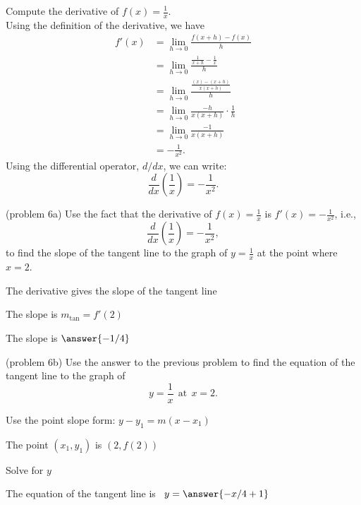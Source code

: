 \documentclass[handout]{ximera}
\begin{document}
\begin{example}[example 6]
Compute the derivative of $f(x) = \displaystyle{\frac{1}{x}}$.\\
Using the definition of the derivative, we have
\begin{align*}
f'(x) &= \lim_{h \to 0} \frac{f(x+h)-f(x)}{h}\\[5pt]
&= \lim_{h \to 0} \frac{\frac{1}{x+h}- \frac{1}{x}}{h}\\[5pt]
&= \lim_{h \to 0} \frac{\frac{(x) - (x+h)}{x(x+h)}}{h} \\[5pt]
&=  \lim_{h \to 0} \frac{-h}{x(x+h)}\cdot \frac{1}{h}\\[5pt]
&= \lim_{h \to 0} \frac{-1}{x(x+h)} \\[5pt]
&= -\frac{1}{x^2}.
\end{align*}
Using the differential operator, $d/dx$, we can write:
\[
 \frac{d}{dx}\left({\frac{1}{x}}\right) = -\frac{1}{x^2}.
\]
\end{example}




\begin{problem}(problem 6a)
Use the fact that the derivative of $f(x) = \frac{1}{x}$ is $f'(x) = -\frac{1}{x^2}$,
i.e., 
\[
\frac{d}{dx}\left(\frac{1}{x}\right) = -\frac{1}{x^2},
\]
to find the slope of the tangent line to the graph of 
$y = \frac{1}{x}$ at the point where $x = 2$.\\
\begin{hint}
The derivative gives the slope of the tangent line
\end{hint}
\begin{hint}
The slope is $m_{\text{tan}} = f'(2)$
\end{hint}
The slope is $\answer{-1/4}$
\end{problem}




\begin{problem}(problem 6b)
Use the answer to the previous problem to find the equation of the tangent line to the graph of 
\[
y = \frac{1}{x} \ \ \text{at} \  \ x=2.
\]
\begin{hint}
Use the point slope form: $y-y_1 = m(x-x_1)$
\end{hint}
\begin{hint}
The point $(x_1,y_1)$ is $(2, f(2))$
\end{hint}
\begin{hint}
Solve for $y$
\end{hint}
The equation of the tangent line is \ $y = \answer{-x/4 + 1}$
\end{problem}
\end{document}
